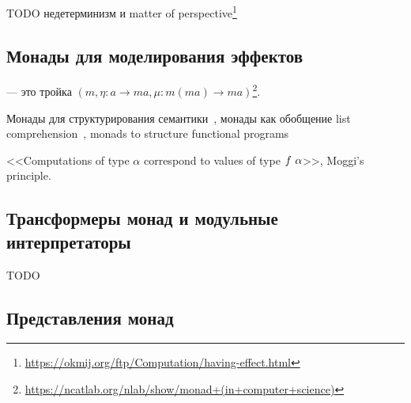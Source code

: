 
TODO недетерминизм и matter of perspective\footnote{\url{https://okmij.org/ftp/Computation/having-effect.html}} %


\subsection{Монады для моделирования эффектов}

 --- это тройка $(m, \eta : a \to m a, \mu : m (m a) \to m a)$\footnote{\url{https://ncatlab.org/nlab/show/monad+(in+computer+science)}}.

Монады для структурирования семантики~\cite{moggi1988computational}, монады как обобщение list comprehension~\cite{wadler1990comprehending}, monads to structure functional programs~\cite{wadler1992essence} %

<<Computations of type $\alpha$ correspond to values of type $f~\alpha$>>, Moggi's principle. %




\subsection{Трансформеры монад и модульные интерпретаторы}




TODO\cite{liang1995monad} %

\subsection{Представления монад}







